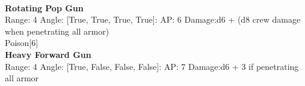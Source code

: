 \ \\
{\bf Rotating Pop Gun } \\



Range: 4  Angle: [True, True, True, True]: AP: 6 Damage:d6 + (d8 crew damage when penetrating all armor) \\
Poison[6]\\ 




{\bf Heavy Forward Gun } \\



Range: 4  Angle: [True, False, False, False]: AP: 7 Damage:d6 + 3 if penetrating all armor \\




 
\ \\



